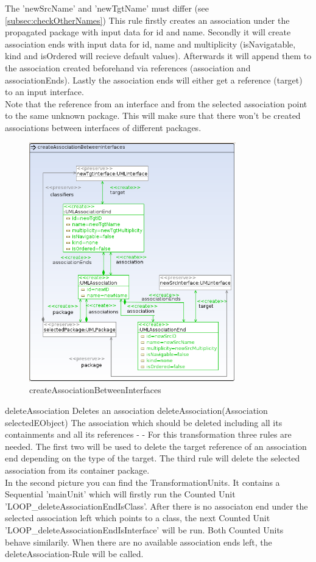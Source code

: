 {The 'newSrcName' and 'newTgtName' must differ (see
\ref{subsec:checkOtherNames})}
{This rule firstly creates an association under the propagated package with
input data for id and name. Secondly it will create association ends with input data for id, name and
multiplicity (isNavigatable, kind and isOrdered will recieve default
values). Afterwards it will append them to the association created beforehand
via references (association and associationEnds). Lastly the association
ends will either get a reference (target) to an input interface.
\\Note that the reference from an interface and from the selected association
point to the same unknown package. This will make sure that there won't be created
associations between interfaces of different packages.}
\begin{figure}[H]
  \centering
  \includegraphics[width=0.8\textwidth]{pics/createAssociationBetweenInterfaces.png}
  \caption{createAssociationBetweenInterfaces}
  \label{createAssociationBetweenInterfaces}
\end{figure}
\op
{deleteAssociation}
{Deletes an association}
{deleteAssociation(Association selectedEObject)}
{The association which should be deleted including all its containments and all
its references}
{-}
{-}
{For this transformation three rules are needed. The first two will be used to
delete the target reference of an association end depending on the type of
the target. The third rule will delete the selected association from its
container package.
\\In the second picture you can find the TransformationUnits. It contains a
Sequential 'mainUnit' which will firstly run the Counted Unit
'LOOP\_deleteAssociationEndIsClass'. After there is no associaton end under the
selected association left which points to a class, the next Counted Unit
'LOOP\_deleteAssociationEndIsInterface' will be run. Both Counted Units behave
similarily. When there are no available association ends left, the
deleteAssociation-Rule will be called.}
